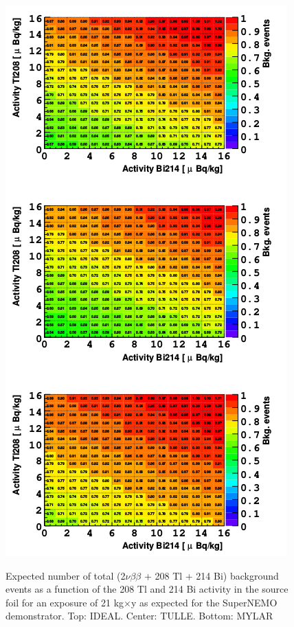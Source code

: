 \documentclass[main.tex]{subfiles}
\begin{document}
\begin{figure}[h!]
\centering
\includegraphics[scale=0.7]{pictures/Chap4/Nbkg_3designs.png}
\label{Nbkg_3designs.png}
\caption{Expected number of total (2$\nu\beta\beta$ + 208 Tl + 214 Bi) background events as a function of the 208 Tl and 214 Bi activity in the source foil for an exposure of 21 kg$\times$y as expected for the SuperNEMO demonstrator. Top: IDEAL. Center: TULLE. Bottom: MYLAR}
\end{figure}
\end{document}
